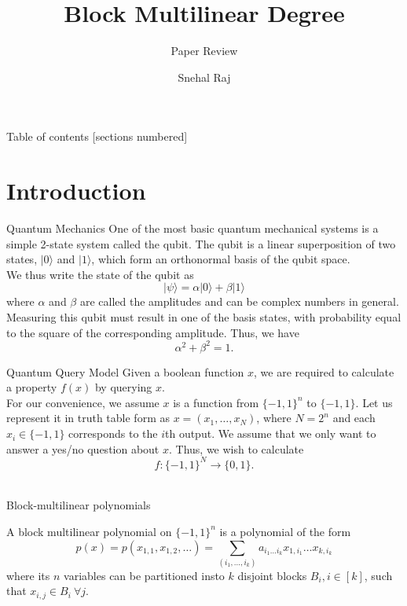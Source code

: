 \documentclass[10pt]{beamer}
\title{Block Multilinear Degree}
\subtitle{Paper Review}
\date{}
\author{Snehal Raj}
\institute{IIT Kanpur}
\begin{document}
\maketitle

\begin{frame}{Table of contents}
  [sections numbered]
  \tableofcontents[hideallsubsections]
\end{frame}

\section{Introduction}

\begin{frame}[fragile]{Quantum Mechanics}
 One of the most basic quantum mechanical systems is a simple 2-state system called the qubit. The qubit is a linear superposition of two states, $|0\rangle$ and $|1\rangle$, which form an orthonormal basis of the qubit space.\\
\vspace{1em}
 We thus write the state of the qubit as $$|\psi\rangle = \alpha|0\rangle + \beta|1\rangle$$ where $\alpha$ and $\beta$ are called the amplitudes and can be complex numbers in general.\\
 Measuring this qubit must result in one of the basis states, with probability equal to the square of the corresponding amplitude. Thus, we have $$\alpha^2 + \beta^2 = 1.$$
\end{frame}

\begin{frame}{Quantum Query Model}
 Given a boolean function $x$, we are required to calculate a property $f(x)$ by querying $x$.\\
 For our convenience, we assume $x$ is a function from $\{-1,1\}^n$ to $\{-1,1\}$. Let us represent it in truth table form as $x = (x_1, \ldots, x_N)$, where $N = 2^n$ and each $x_i \in \{-1,1\}$ corresponds to the $i$th output. We assume that we only want to answer a yes/no question about $x$. Thus, we wish to calculate $$f\colon \{-1,1\}^N \longrightarrow \{0,1\}.$$ \\
\end{frame} 

\begin{frame}{Block-multilinear polynomials}
\begin{definition}
A block multilinear polynomial on $\{-1,1\}^n$ is a polynomial of the form $$p(x) = p(x_{1,1}, x_{1,2}, \ldots) = \sum_{(i_1, \ldots, i_k)} a_{i_1 \ldots i_k} x_{1,i_1} \ldots x_{k,i_k}$$ where its $n$ variables can be partitioned insto $k$ disjoint blocks $B_i, i \in [k]$, such that $x_{i,j} \in B_i\ \forall j$. 
\end{definition}
\end{frame}
\end{document}
